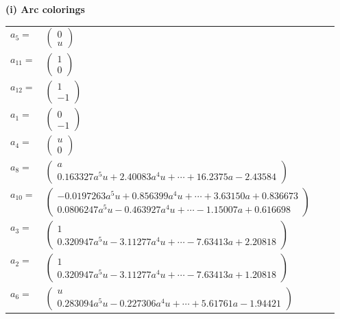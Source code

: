 \documentclass[1p]{elsarticle_modified}
\theoremstyle{definition}
\begin{document}
\flushleft \textbf{(i) Arc colorings}\\
\begin{tabular}{m{7pt} m{180pt} m{7pt} m{180pt} }
\flushright $a_{5}=$&$\begin{pmatrix}0\\u\end{pmatrix}$ \\
\flushright $a_{11}=$&$\begin{pmatrix}1\\0\end{pmatrix}$ \\
\flushright $a_{12}=$&$\begin{pmatrix}1\\-1\end{pmatrix}$ \\
\flushright $a_{1}=$&$\begin{pmatrix}0\\-1\end{pmatrix}$ \\
\flushright $a_{4}=$&$\begin{pmatrix}u\\0\end{pmatrix}$ \\
\flushright $a_{8}=$&$\begin{pmatrix}a\\0.163327 a^{5} u+2.40083 a^{4} u+\cdots+16.2375 a-2.43584\end{pmatrix}$ \\
\flushright $a_{10}=$&$\begin{pmatrix}-0.0197263 a^{5} u+0.856399 a^{4} u+\cdots+3.63150 a+0.836673\\0.0806247 a^{5} u-0.463927 a^{4} u+\cdots-1.15007 a+0.616698\end{pmatrix}$ \\
\flushright $a_{3}=$&$\begin{pmatrix}1\\0.320947 a^{5} u-3.11277 a^{4} u+\cdots-7.63413 a+2.20818\end{pmatrix}$ \\
\flushright $a_{2}=$&$\begin{pmatrix}1\\0.320947 a^{5} u-3.11277 a^{4} u+\cdots-7.63413 a+1.20818\end{pmatrix}$ \\
\flushright $a_{6}=$&$\begin{pmatrix}u\\0.283094 a^{5} u-0.227306 a^{4} u+\cdots+5.61761 a-1.94421\end{pmatrix}$ \\

\end{tabular}
\end{document}
